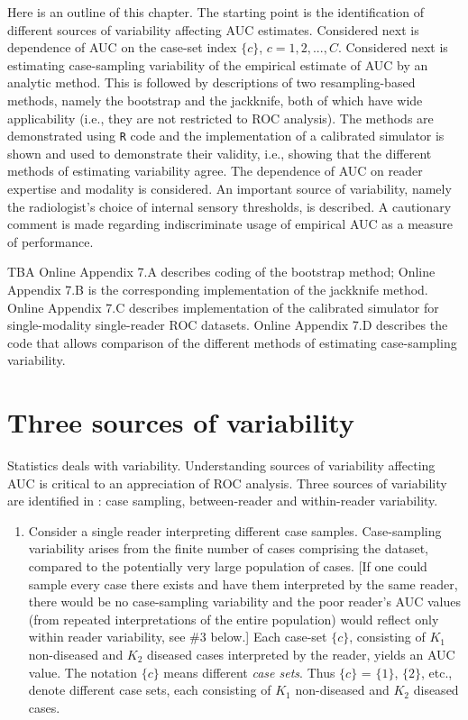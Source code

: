 \documentclass[
]{book}
\providecommand{\tightlist}{%
  \setlength{\itemsep}{0pt}\setlength{\parskip}{0pt}}
\begin{document}
Here is an outline of this chapter. The starting point is the identification of different sources of variability affecting AUC estimates. Considered next is dependence of AUC on the case-set index \(\{c\}\), \(c = 1,2,...,C\). Considered next is estimating case-sampling variability of the empirical estimate of AUC by an analytic method. This is followed by descriptions of two resampling-based methods, namely the bootstrap and the jackknife, both of which have wide applicability (i.e., they are not restricted to ROC analysis). The methods are demonstrated using \texttt{R} code and the implementation of a calibrated simulator is shown and used to demonstrate their validity, i.e., showing that the different methods of estimating variability agree. The dependence of AUC on reader expertise and modality is considered. An important source of variability, namely the radiologist's choice of internal sensory thresholds, is described. A cautionary comment is made regarding indiscriminate usage of empirical AUC as a measure of performance.

TBA Online Appendix 7.A describes coding of the bootstrap method; Online Appendix 7.B is the corresponding implementation of the jackknife method. Online Appendix 7.C describes implementation of the calibrated simulator for single-modality single-reader ROC datasets. Online Appendix 7.D describes the code that allows comparison of the different methods of estimating case-sampling variability.

\hypertarget{sources-of-variability3sources}{%
\section{Three sources of variability}\label{sources-of-variability3sources}}

Statistics deals with variability. Understanding sources of variability affecting AUC is critical to an appreciation of ROC analysis. Three sources of variability are identified in \citep{RN412}: case sampling, between-reader and within-reader variability.

\begin{enumerate}
\def\labelenumi{\arabic{enumi}.}
\tightlist
\item
  Consider a single reader interpreting different case samples. Case-sampling variability arises from the finite number of cases comprising the dataset, compared to the potentially very large population of cases. {[}If one could sample every case there exists and have them interpreted by the same reader, there would be no case-sampling variability and the poor reader's AUC values (from repeated interpretations of the entire population) would reflect only within reader variability, see \#3 below.{]} Each case-set \(\{c\}\), consisting of \(K_1\) non-diseased and \(K_2\) diseased cases interpreted by the reader, yields an AUC value. The notation \(\{c\}\) means different \emph{case sets}. Thus \(\{c\}\) = \(\{1\}\), \(\{2\}\), etc., denote different case sets, each consisting of \(K_1\) non-diseased and \(K_2\) diseased cases.
\end{enumerate}
\end{document}
